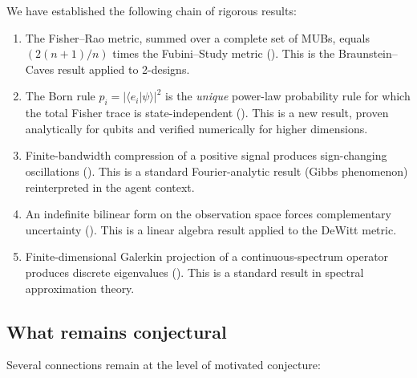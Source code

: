 \documentclass[12pt,a4paper]{article}
\theoremstyle{definition}
\newcommand{\ip}[2]{\langle #1 | #2 \rangle}
\begin{document}
We have established the following chain of rigorous results:

\begin{enumerate}
\item The Fisher--Rao metric, summed over a complete set of MUBs,
  equals $(2(n+1)/n)$ times the Fubini--Study metric
  (). This is the Braunstein--Caves result
  \cite{BraunsteinCaves1994} applied to 2-designs.

\item The Born rule $p_i = |\ip{e_i}{\psi}|^2$ is the \emph{unique}
  power-law probability rule for which the total Fisher trace is
  state-independent (). This is a new result,
  proven analytically for qubits and verified numerically for higher
  dimensions.

\item Finite-bandwidth compression of a positive signal produces
  sign-changing oscillations (). This is a
  standard Fourier-analytic result (Gibbs phenomenon) reinterpreted in
  the agent context.

\item An indefinite bilinear form on the observation space forces
  complementary uncertainty (). This is a linear
  algebra result applied to the DeWitt metric.

\item Finite-dimensional Galerkin projection of a continuous-spectrum
  operator produces discrete eigenvalues ().
  This is a standard result in spectral approximation theory.
\end{enumerate}

\subsection{What remains conjectural}

Several connections remain at the level of motivated conjecture:
\end{document}
